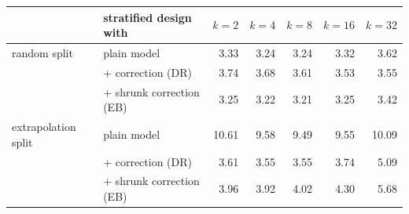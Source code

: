 {\scriptsize
\begin{tabular}{llrrrrr}
\toprule
 & stratified design with & $k{=}2$ & $k{=}4$ & $k{=}8$ & $k{=}16$ & $k{=}32$ \\
\midrule
random split & plain model & 3.33 & 3.24 & 3.24 & 3.32 & 3.62 \\
 & + correction (DR) & 3.74 & 3.68 & 3.61 & 3.53 & 3.55 \\
 & + shrunk correction (EB) & 3.25 & 3.22 & 3.21 & 3.25 & 3.42 \\
extrapolation split & plain model & 10.61 & 9.58 & 9.49 & 9.55 & 10.09 \\
 & + correction (DR) & 3.61 & 3.55 & 3.55 & 3.74 & 5.09 \\
 & + shrunk correction (EB) & 3.96 & 3.92 & 4.02 & 4.30 & 5.68 \\
\bottomrule
\end{tabular}}
